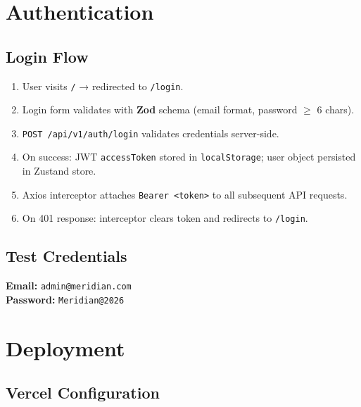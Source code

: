 \documentclass[12pt,a4paper]{article}
\begin{document}
\section{Authentication}

\subsection{Login Flow}

\begin{enumerate}[leftmargin=2em]
  \item User visits \texttt{/} → redirected to \texttt{/login}.
  \item Login form validates with \textbf{Zod} schema (email format, password $\geq$ 6 chars).
  \item \texttt{POST /api/v1/auth/login} validates credentials server-side.
  \item On success: JWT \texttt{accessToken} stored in \texttt{localStorage}; user object persisted in Zustand store.
  \item Axios interceptor attaches \texttt{Bearer <token>} to all subsequent API requests.
  \item On 401 response: interceptor clears token and redirects to \texttt{/login}.
\end{enumerate}

\subsection{Test Credentials}

\begin{tcolorbox}[colback=meridian!5, colframe=meridian, title=Demo Login]
\textbf{Email:} \texttt{admin@meridian.com}\\
\textbf{Password:} \texttt{Meridian@2026}
\end{tcolorbox}

\section{Deployment}

\subsection{Vercel Configuration}
\end{document}
